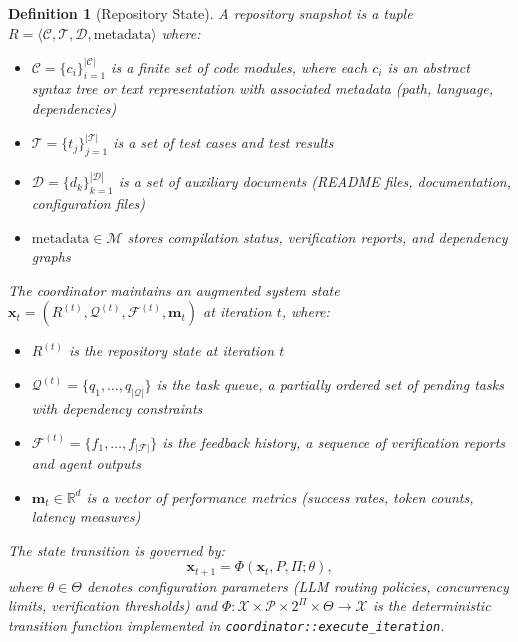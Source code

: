\documentclass{ieeeaccess}
\newtheorem{definition}{Definition}
\begin{document}
\begin{definition}[Repository State]
A repository snapshot is a tuple \(R = \langle \mathcal{C}, \mathcal{T}, \mathcal{D}, \text{metadata} \rangle\) where:
\begin{itemize}
\item \(\mathcal{C} = \{c_i\}_{i=1}^{|\mathcal{C}|}\) is a finite set of code modules, where each \(c_i\) is an abstract syntax tree or text representation with associated metadata (path, language, dependencies)
\item \(\mathcal{T} = \{t_j\}_{j=1}^{|\mathcal{T}|}\) is a set of test cases and test results
\item \(\mathcal{D} = \{d_k\}_{k=1}^{|\mathcal{D}|}\) is a set of auxiliary documents (README files, documentation, configuration files)
\item \(\text{metadata} \in \mathcal{M}\) stores compilation status, verification reports, and dependency graphs
\end{itemize}
The coordinator maintains an augmented system state \(\mathbf{x}_t = (R^{(t)}, \mathcal{Q}^{(t)}, \mathcal{F}^{(t)}, \mathbf{m}_t)\) at iteration \(t\), where:
\begin{itemize}
\item \(R^{(t)}\) is the repository state at iteration \(t\)
\item \(\mathcal{Q}^{(t)} = \{q_1, \ldots, q_{|\mathcal{Q}|}\}\) is the task queue, a partially ordered set of pending tasks with dependency constraints
\item \(\mathcal{F}^{(t)} = \{f_1, \ldots, f_{|\mathcal{F}|}\}\) is the feedback history, a sequence of verification reports and agent outputs
\item \(\mathbf{m}_t \in \mathbb{R}^d\) is a vector of performance metrics (success rates, token counts, latency measures)
\end{itemize}
The state transition is governed by:
\begin{equation}
\mathbf{x}_{t+1} = \Phi(\mathbf{x}_t, P, \Pi; \theta),
\label{eq:state-transition}
\end{equation}
where \(\theta \in \Theta\) denotes configuration parameters (LLM routing policies, concurrency limits, verification thresholds) and \(\Phi: \mathcal{X} \times \mathcal{P} \times 2^{\Pi} \times \Theta \to \mathcal{X}\) is the deterministic transition function implemented in \texttt{coordinator::execute\_iteration}.
\end{definition}
\end{document}
